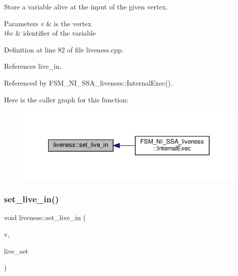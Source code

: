 Store a variable alive at the input of the given vertex. 


\begin{DoxyParams}{Parameters}
{\em v} & is the vertex \\
\hline
{\em the} & identifier of the variable \\
\hline
\end{DoxyParams}


Definition at line 82 of file liveness.\+cpp.



References live\+\_\+in.



Referenced by F\+S\+M\+\_\+\+N\+I\+\_\+\+S\+S\+A\+\_\+liveness\+::\+Internal\+Exec().

Here is the caller graph for this function\+:
\nopagebreak
\begin{figure}[H]
\begin{center}
\leavevmode
\includegraphics[width=341pt]{d3/d1f/classliveness_a6e7f7ae85f11dc785448d459881857af_icgraph}
\end{center}
\end{figure}
\mbox{\label{classliveness_a38a6af87fd65b4b5436b983cbeca97e3}} 
\subsubsection{\texorpdfstring{set\+\_\+live\+\_\+in()}{set\_live\_in()}\hspace{0.1cm}{\footnotesize\ttfamily [2/3]}}
{\footnotesize\ttfamily void liveness\+::set\+\_\+live\+\_\+in (\begin{DoxyParamCaption}\item[{const \hyperlink{graph_8hpp_abefdcf0544e601805af44eca032cca14}{vertex} \&}]{v,  }\item[{const \hyperlink{classCustomOrderedSet}{Custom\+Ordered\+Set}$<$ unsigned int $>$ \&}]{live\+\_\+set }\end{DoxyParamCaption})}



